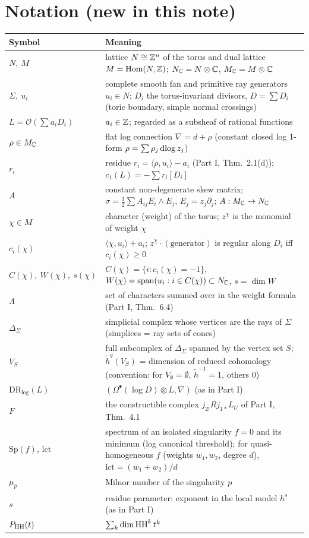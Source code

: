 \section{Notation (new in this note)}\label{sec:notation}
\begin{longtable}{>{\raggedright\arraybackslash}p{3.6cm}>{\raggedright\arraybackslash}p{11.4cm}}
\toprule Symbol & Meaning\\ \midrule\endhead
$N,\ M$ & lattice $N\cong\mathbb Z^n$ of the torus and dual lattice $M=\mathrm{Hom}(N,\mathbb Z)$; $N_\mathbb C=N\otimes\mathbb C$, $M_\mathbb C=M\otimes\mathbb C$\\
$\Sigma,\ u_i$ & complete smooth fan and primitive ray generators $u_i\in N$; $D_i$ the torus-invariant divisors, $D=\sum D_i$ (toric boundary, simple normal crossings)\\
$L=\mathcal O(\sum a_iD_i)$ & $a_i\in\mathbb Z$; regarded as a subsheaf of rational functions\\
$\rho\in M_\mathbb C$ & flat log connection $\nabla=d+\rho$ (constant closed log 1-form $\rho=\sum\rho_j\,\mathrm{dlog}\, z_j$)\\
$r_i$ & residue $r_i=\langle\rho,u_i\rangle-a_i$ (Part I, Thm.\ 2.1(d)); $c_1(L)=-\sum r_i[D_i]$\\
$A$ & constant non-degenerate skew matrix; $\sigma=\tfrac12\sum A_{ij}E_i\wedge E_j$, $E_j=z_j\partial_j$; $A:M_\mathbb C\to N_\mathbb C$\\
$\chi\in M$ & character (weight) of the torus; $z^\chi$ is the monomial of weight $\chi$\\
$c_i(\chi)$ & $\langle\chi,u_i\rangle+a_i$; $z^\chi\cdot(\text{generator})$ is regular along $D_i$ iff $c_i(\chi)\ge0$\\
$C(\chi),\ W(\chi),\ s(\chi)$ & $C(\chi)=\{i:c_i(\chi)=-1\}$, $W(\chi)=\mathrm{span}(u_i:i\in C(\chi))\subset N_\mathbb C$, $s=\dim W$\\
$\Lambda$ & set of characters summed over in the weight formula (Part I, Thm.\ 6.4)\\
$\Delta_\Sigma$ & simplicial complex whose vertices are the rays of $\Sigma$ (simplices = ray sets of cones)\\
$V_S$ & full subcomplex of $\Delta_\Sigma$ spanned by the vertex set $S$; $\tilde h^q(V_S)$ = dimension of reduced cohomology (convention: for $V_\emptyset=\emptyset$, $\tilde h^{-1}=1$, others $0$)\\
$\mathrm{DR}_{\log}(L)$ & $(\Omega^\bullet(\log D)\otimes L,\nabla)$ (as in Part I)\\
$F$ & the constructible complex $j_{2!}Rj_{1*}L_U$ of Part I, Thm.\ 4.1\\
$\mathrm{Sp}(f)$, $\mathrm{lct}$ & spectrum of an isolated singularity $f=0$ and its minimum (log canonical threshold); for quasi-homogeneous $f$ (weights $w_1,w_2$, degree $d$), $\mathrm{lct}=(w_1+w_2)/d$\\
$\mu_p$ & Milnor number of the singularity $p$\\
$s$ & residue parameter: exponent in the local model $h^s$ (as in Part I)\\
$P_{\mathrm{HH}}(t)$ & $\sum_k\dim\mathrm{HH}^k\,t^k$\\
\bottomrule
\end{longtable}
